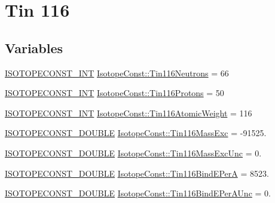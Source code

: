 \hypertarget{group___isotope_const-_tin-_sn116}{}\section{Tin 116}
\label{group___isotope_const-_tin-_sn116}
\subsection*{Variables}
\begin{DoxyCompactItemize}
\item 
\mbox{\hyperlink{group___isotope_const-_macros_ga5f18360b3e99483a35c32d789e62621c}{I\+S\+O\+T\+O\+P\+E\+C\+O\+N\+S\+T\+\_\+\+I\+NT}} \mbox{\hyperlink{group___isotope_const-_tin-_sn116_gab9ea54c3adad06d9366ab4a0f12bb83b}{Isotope\+Const\+::\+Tin116\+Neutrons}} = 66
\item 
\mbox{\hyperlink{group___isotope_const-_macros_ga5f18360b3e99483a35c32d789e62621c}{I\+S\+O\+T\+O\+P\+E\+C\+O\+N\+S\+T\+\_\+\+I\+NT}} \mbox{\hyperlink{group___isotope_const-_tin-_sn116_ga170919238dff5c84f0e2b41f7950fb47}{Isotope\+Const\+::\+Tin116\+Protons}} = 50
\item 
\mbox{\hyperlink{group___isotope_const-_macros_ga5f18360b3e99483a35c32d789e62621c}{I\+S\+O\+T\+O\+P\+E\+C\+O\+N\+S\+T\+\_\+\+I\+NT}} \mbox{\hyperlink{group___isotope_const-_tin-_sn116_ga1bfb6b849550afcb9e222838e3a1873d}{Isotope\+Const\+::\+Tin116\+Atomic\+Weight}} = 116
\item 
\mbox{\hyperlink{group___isotope_const-_macros_ga8f45a7272ce02c0b4c65c44636ed719a}{I\+S\+O\+T\+O\+P\+E\+C\+O\+N\+S\+T\+\_\+\+D\+O\+U\+B\+LE}} \mbox{\hyperlink{group___isotope_const-_tin-_sn116_ga284e0f206420236ca354026dc0454439}{Isotope\+Const\+::\+Tin116\+Mass\+Exc}} = -\/91525.
\item 
\mbox{\hyperlink{group___isotope_const-_macros_ga8f45a7272ce02c0b4c65c44636ed719a}{I\+S\+O\+T\+O\+P\+E\+C\+O\+N\+S\+T\+\_\+\+D\+O\+U\+B\+LE}} \mbox{\hyperlink{group___isotope_const-_tin-_sn116_gaa81e615155f1c5cfe41f0a84d9c27e83}{Isotope\+Const\+::\+Tin116\+Mass\+Exc\+Unc}} = 0.
\item 
\mbox{\hyperlink{group___isotope_const-_macros_ga8f45a7272ce02c0b4c65c44636ed719a}{I\+S\+O\+T\+O\+P\+E\+C\+O\+N\+S\+T\+\_\+\+D\+O\+U\+B\+LE}} \mbox{\hyperlink{group___isotope_const-_tin-_sn116_ga46fbaf9fd44916990c454337812b4be3}{Isotope\+Const\+::\+Tin116\+Bind\+E\+PerA}} = 8523.
\item 
\mbox{\hyperlink{group___isotope_const-_macros_ga8f45a7272ce02c0b4c65c44636ed719a}{I\+S\+O\+T\+O\+P\+E\+C\+O\+N\+S\+T\+\_\+\+D\+O\+U\+B\+LE}} \mbox{\hyperlink{group___isotope_const-_tin-_sn116_ga472280d5be820f0785ab11eeba9c6c19}{Isotope\+Const\+::\+Tin116\+Bind\+E\+Per\+A\+Unc}} = 0.

\end{DoxyCompactItemize}
